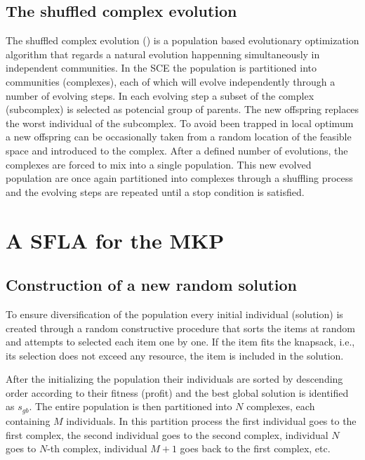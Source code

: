 \documentclass[conference, compsocconf]{IEEEtran}
\begin{document}
\subsection{The shuffled complex evolution}

The shuffled complex evolution (\cite{duan1992effective}) is a population
based evolutionary optimization algorithm that regards a natural 
evolution happenning simultaneously in independent communities.
In the SCE the population is partitioned into communities (complexes), each of which
will evolve independently through a number of evolving steps.
In each evolving step a subset of the complex (subcomplex) is selected as potencial group of
parents.
The new offspring replaces the worst individual of the subcomplex.
To avoid been trapped in local optimum a new offspring can be occasionally taken
from a random location of the feasible space and introduced to the complex.
After a defined number of evolutions, the complexes are forced to mix into a
single population.
This new evolved population are once again partitioned into complexes through
a shuffling process and the evolving steps are repeated until a stop
condition is satisfied.

\section{A SFLA for the MKP}
\label{sec:sfla-mkp}

\subsection{Construction of a new random solution}

To ensure diversification of the population every initial individual (solution)
is created through a random constructive procedure that sorts the items at
random and attempts to selected each item one by one.
If the item fits the knapsack, i.e., its selection does not exceed any resource,
the item is included in the solution.

After the initializing the population their individuals are sorted by
descending order according to their fitness (profit) and the best global
solution is identified as $s_{gb}$.
The entire population is then partitioned into $N$ complexes, each containing
$M$ individuals.
In this partition process the first individual goes to the first complex, the second
individual goes to the second complex, individual $N$ goes to $N$-th complex,
individual $M+1$ goes back to the first complex, etc.
\end{document}
